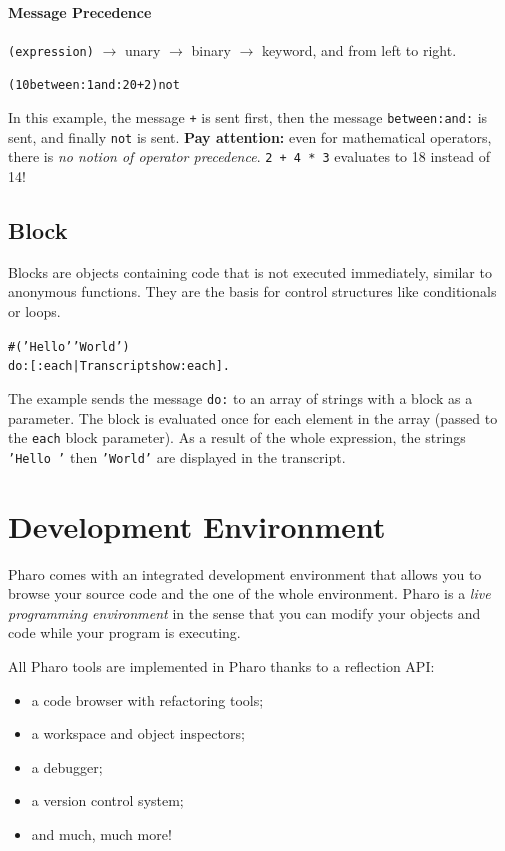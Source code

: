 \documentclass[notumble]{leaflet}
\makeatletter
\newenvironment{displaycode}{%
        \begin{lrbox}{\code@box}%
                \begin{minipage}{\linewidth}
                        \begin{alltt}\small
}{
                        \end{alltt}
                \end{minipage}
        \end{lrbox}
        \colorbox{light-gray}{\usebox{\code@box}}
}
\newcommand{\code}[1]{\foreignlanguage{english}{\texttt{#1}}}
\makeatother
\begin{document}
\paragraph{Message Precedence}

\code{(expression)} $\longrightarrow{}$ unary $\longrightarrow{}$
binary $\longrightarrow{}$ keyword, and from left to right.

\begin{displaycode}
(10 between: 1 and: 20 + 2) not
\end{displaycode}

In this example, the message \code{+} is sent first, then the message
\code{between:and:} is sent, and finally \code{not} is sent.
\textbf{Pay attention:} even for mathematical operators, there is
\emph{no notion of operator precedence}. \code{2 + 4 * 3} evaluates to
18 instead of 14!

\subsection{Block}

Blocks are objects containing code that is not executed immediately,
similar to anonymous functions. They are the basis for control
structures like conditionals or loops.

\begin{displaycode}
\#('Hello' ' World')
  do: [ :each | Transcript show: each ].
\end{displaycode}

The example sends the message \code{do:} to an array of strings with a
block as a parameter. The block is evaluated once for each element in
the array (passed to the \code{each} block parameter). As a result of
the whole expression, the strings \code{'Hello '} then \code{'World'}
are displayed in the transcript.

\section{Development Environment}

Pharo comes with an integrated development environment that allows you
to browse your source code and the one of the whole environment. Pharo
is a \emph{live programming environment} in the sense that you can
modify your objects and code while your program is executing.

All Pharo tools are implemented in Pharo thanks to a reflection API:

\begin{itemize}
\item a code browser with refactoring tools;
\item a workspace and object inspectors;
\item a debugger;
\item a version control system;
\item and much, much more!
\end{itemize}
\end{document}
